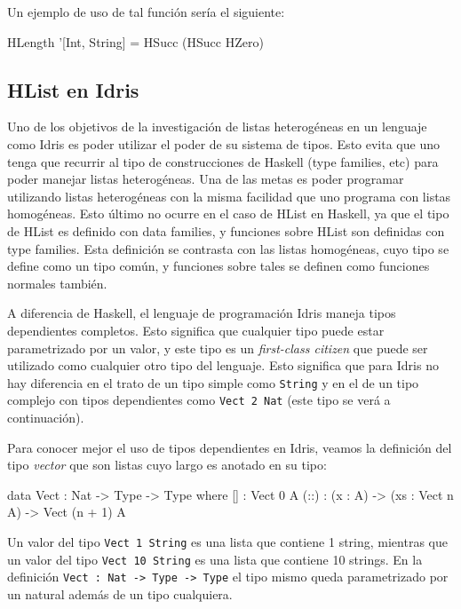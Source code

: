 Un ejemplo de uso de tal función sería el siguiente:

\begin{code}
HLength '[Int, String] = HSucc (HSucc HZero)
\end{code}

\subsection{HList en Idris}

Uno de los objetivos de la investigación de listas heterogéneas en un lenguaje como Idris es poder utilizar el poder de su sistema de tipos. Esto evita que uno tenga que recurrir al tipo de construcciones de Haskell (type families, etc) para poder manejar listas heterogéneas. Una de las metas es poder programar utilizando listas heterogéneas con la misma facilidad que uno programa con listas homogéneas.
Esto último no ocurre en el caso de HList en Haskell, ya que el tipo de HList es definido con data families, y funciones sobre HList son definidas con type families. Esta definición se contrasta con las listas homogéneas, cuyo tipo se define como un tipo común, y funciones sobre tales se definen como funciones normales también.

A diferencia de Haskell, el lenguaje de programación Idris maneja tipos dependientes completos. Esto significa que cualquier tipo puede estar parametrizado por un valor, y este tipo es un \textit{first-class citizen} que puede ser utilizado como cualquier otro tipo del lenguaje. Esto significa que para Idris no hay diferencia en el trato de un tipo simple como \texttt{String} y en el de un tipo complejo con tipos dependientes como \texttt{Vect 2 Nat} (este tipo se verá a continuación).

Para conocer mejor el uso de tipos dependientes en Idris, veamos la definición del tipo \textit{vector} que son listas cuyo largo es anotado en su tipo:

\begin{code}
data Vect : Nat -> Type -> Type where
  [] : Vect 0 A
  (::) : (x : A) -> (xs : Vect n A) -> Vect (n + 1) A
\end{code}

Un valor del tipo \texttt{Vect 1 String} es una lista que contiene 1 string, mientras que un valor del tipo \texttt{Vect 10 String} es una lista que contiene 10 strings. En la definición \texttt{Vect : Nat -> Type -> Type} el tipo mismo queda parametrizado por un natural además de un tipo cualquiera.


